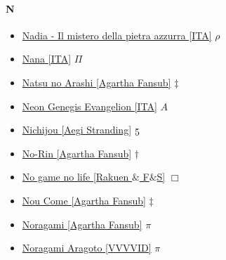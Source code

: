 		\paragraph{N} \hypertarget{SN}{}
			\begin{itemize}
				
				\item \href{https://mega.nz/#F!QUA2Ub7C!jn9vzJ9x5PIgC5FFRcs7tQ} {Nadia - Il mistero della pietra azzurra [ITA]}  $\rho$ \\ 
				\item \href{https://mega.nz/#F!0WIUmAQZ!pinT8QTgImsuahtyzhnMYQ} {Nana [ITA]}  $\varPi$ \\
				\item \href{https://mega.nz/#F!L2BnAY6L!_O-j72uXs8JJo2GufozGNA} {Natsu no Arashi [Agartha Fansub]}  $\ddag$ \\
				\item \href{https://mega.nz/#F!O0xiyaQL!LCYd_X1vjTvyKbnvmrBCOQ} {Neon Genegis Evangelion [ITA]}  $A$ \\ 
				\item \href{https://mega.nz/#F!bvQWxC7Y!4vy7HJ6zNHTsfkMggEvNOA} {Nichijou [Aegi Stranding]}  $\oldstylenums{5}$ \\ 
				\item \href{https://mega.nz/#F!uCIDiIJI!-5fBZBFR6rOfeFvlFbaQjw} {No-Rin [Agartha Fansub]}  $\dag$ \\ 
				\item \href{https://mega.nz/#F!9nImFSba!qTyL_vWCYGSOC6vvLlrC2g} {No game no life [Rakuen $\&$ F$\&$S]}  $\Box$ \\ 
				\item \href{https://mega.nz/#F!jiZV3Q6C!Mh3Um5vGjIRv1-R9ChHIyw} {Nou Come [Agartha Fansub]}  $\ddag$ \\ 
				\item \href{https://mega.nz/#F!AIIwiZSQ!AwyJ57qdTHQmT3TJpcXgLg} {Noragami [Agartha Fansub]}  $\pi$ \\ 
				\item \href{https://mega.nz/#F!ZARUwaqR!PfY7aK93fptol4BnK2eytg} {Noragami Aragoto [VVVVID]}  $\pi$ \\ 
			
			\end{itemize}	
			

